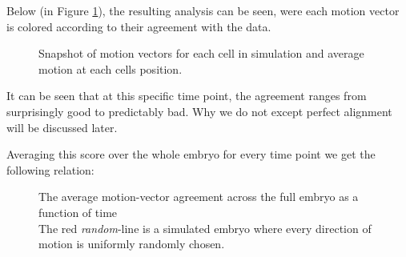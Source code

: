 Below (in Figure  \ref{fig:motionAgreementExample}), the resulting analysis can be seen, were each motion vector is colored according to their agreement with the data.

\begin{figure}[H]
    \centering
    \caption{Snapshot of motion vectors for each cell in simulation and average motion at each cells position. }
    \label{fig:motionAgreementExample}
\end{figure}

It can be seen that at this specific time point, the agreement ranges from surprisingly good to predictably bad. Why we do not except perfect alignment will be discussed later.

Averaging this score over the whole embryo for every time point we get the following relation:

\begin{figure}[H]
    \centering
    \caption{The average motion-vector agreement across the full embryo as a function of time\\
    The red \textit{random}-line is a simulated embryo where every direction of motion is uniformly randomly chosen. }
    \label{fig:motionAgreement}
\end{figure}


